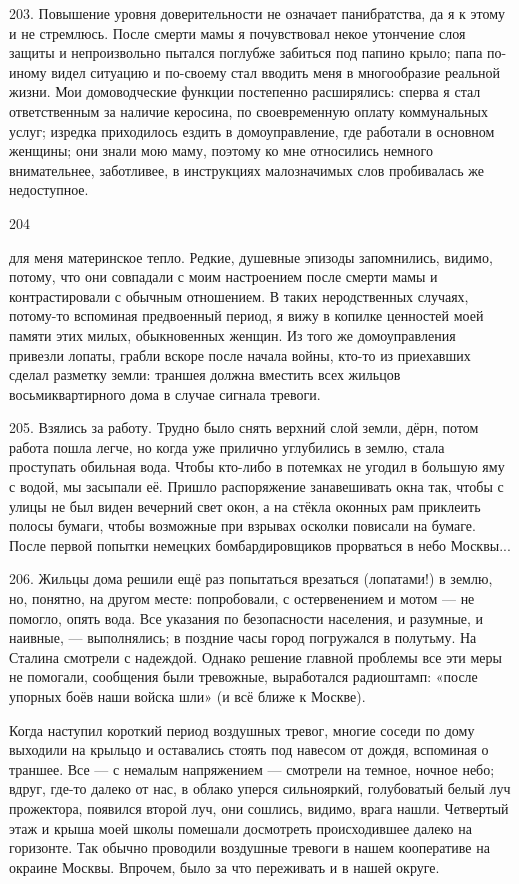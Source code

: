 203. Повышение уровня доверительности не означает панибратства, да я к этому и не стремлюсь. После смерти мамы я почувствовал некое утончение слоя защиты и непроизвольно пытался поглубже забиться под папино крыло; папа по-иному видел ситуацию и по-своему стал вводить меня в многообразие реальной жизни. Мои домоводческие функции постепенно расширялись: сперва я стал ответственным за наличие керосина, по своевременную оплату коммунальных услуг; изредка приходилось ездить в домоуправление, где работали в основном женщины; они знали мою маму, поэтому ко мне относились немного внимательнее, заботливее, в инструкциях малозначимых слов пробивалась же недоступное.

204

для меня материнское тепло. Редкие, душевные эпизоды запомнились, видимо, потому, что они совпадали с моим настроением после смерти мамы и контрастировали с обычным отношением. В таких неродственных случаях, потому-то вспоминая предвоенный период, я вижу в копилке ценностей моей памяти этих милых, обыкновенных женщин. Из того же домоуправления привезли лопаты, грабли вскоре после начала войны, кто-то из приехавших сделал разметку земли: траншея должна вместить всех жильцов восьмиквартирного дома в случае сигнала тревоги.

205. Взялись за работу. Трудно было снять верхний слой земли, дёрн, потом работа пошла легче, но когда уже прилично углубились в землю, стала проступать обильная вода. Чтобы кто-либо в потемках не угодил в большую яму с водой, мы засыпали её. Пришло распоряжение занавешивать окна так, чтобы с улицы не был виден вечерний свет окон, а на стёкла оконных рам приклеить полосы бумаги, чтобы возможные при взрывах осколки повисали на бумаге. После первой попытки немецких бомбардировщиков прорваться в небо Москвы...

206.
Жильцы дома решили ещё раз попытаться врезаться (лопатами!) в землю, но, понятно, на другом месте: попробовали, с остервенением и мотом — не помогло, опять вода. Все указания по безопасности населения, и разумные, и наивные, — выполнялись; в поздние часы город погружался в полутьму. На Сталина смотрели с надеждой.
Однако решение главной проблемы все эти меры не помогали, сообщения были тревожные, выработался радиоштамп: «после упорных боёв наши войска шли» (и всё ближе к Москве).

Когда наступил короткий период воздушных тревог, многие соседи по дому выходили на крыльцо и оставались стоять под навесом от дождя, вспоминая о траншее. Все — с немалым напряжением — смотрели на темное, ночное небо; вдруг, где-то далеко от нас, в облако уперся сильнояркий, голубоватый белый луч прожектора, появился второй луч, они сошлись, видимо, врага нашли. Четвертый этаж и крыша моей школы помешали досмотреть происходившее далеко на горизонте. Так обычно проводили воздушные тревоги в нашем кооперативе на окраине Москвы. Впрочем, было за что переживать и в нашей округе.

